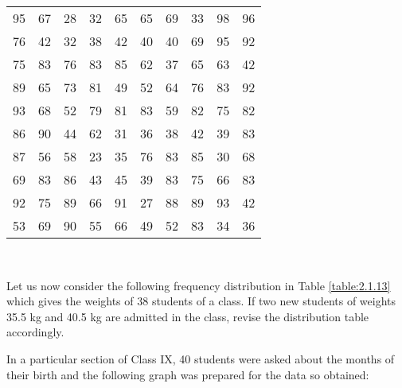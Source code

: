 \begin{tabular}{cccccccccc}
95 &67 &28 &32 &65 &65 &69 &33 &98 &96\\
76 &42 &32 &38 &42 &40 &40 &69 &95 &92\\
75 &83 &76 &83 &85 &62 &37 &65 &63 &42\\
89 &65 &73 &81 &49 &52 &64 &76 &83 &92\\
93 &68 &52 &79 &81 &83 &59 &82 &75 &82\\
86 &90 &44 &62 &31 &36 &38 &42 &39 &83\\
87 &56 &58 &23 &35 &76 &83 &85 &30 &68\\
69 &83 &86 &43 &45 &39 &83 &75 &66 &83\\
92 &75 &89 &66 &91 &27 &88 &89 &93 &42\\
53 &69 &90 &55 &66 &49 &52 &83 &34 &36\\
\end{tabular}\\
\item Let us now consider the following frequency distribution in Table \ref{table:2.1.13}
which gives the weights of 38 students of a class.  If two new students of weights 35.5 kg and 40.5 kg are admitted in the class, revise the distribution table accordingly.
\begin{table}[!ht]
\centering
{}
\caption{}
\label{table:2.1.13}
\end{table}
\item In a particular section of Class IX, 40 students were asked about the months of their birth and the following graph was prepared for the data so obtained:\\

\\

